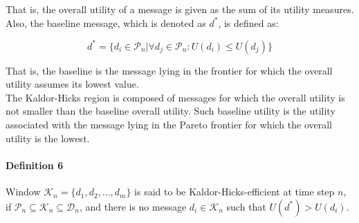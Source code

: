 \noindent That is, the overall utility of a message is given as the sum of its utility measures. Also, the baseline message, which is denoted as $d^*$, is defined as:

\begin{equation}
d^*=\{d_i\in\mathcal{P}_n | \forall d_j\in\mathcal{P}_n: U(d_i)\leq U(d_j)\}
\end{equation}

\noindent That is, the baseline is the message lying in the frontier for which the overall utility assumes its lowest value.\\

The Kaldor-Hicks region is composed of messages for which the overall utility is not smaller than the baseline overall utility. Such baseline utility is the utility associated with the message lying in the Pareto frontier for which the overall utility is the lowest.


\paragraph*{\bf{Definition 6}} Window $\mathcal{K}_n=\{d_1, d_2, \ldots, d_m\}$ is said to be Kaldor-Hicks-efficient at time step $n$, if $\mathcal{P}_n\subseteq\mathcal{K}_n\subseteq\mathcal{D}_n$, and there is no message $d_i\in\mathcal{K}_n$ such that $U(d^*)>U(d_i)$.\\

